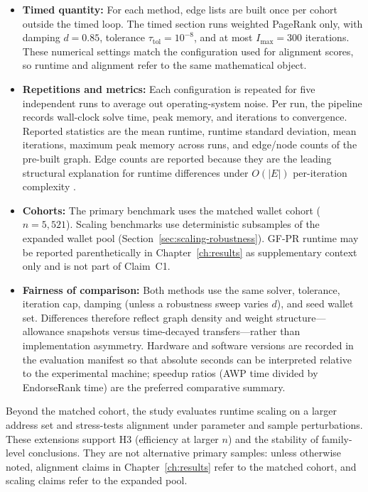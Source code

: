 \begin{itemize}
\item \textbf{Timed quantity:} For each method, edge lists are built once per cohort outside the timed loop. The timed section runs weighted PageRank only, with damping $d=0.85$, tolerance $\tau_{\mathrm{tol}}=10^{-8}$, and at most $I_{\max}=300$ iterations. These numerical settings match the configuration used for alignment scores, so runtime and alignment refer to the same mathematical object.

\item \textbf{Repetitions and metrics:} Each configuration is repeated for five independent runs to average out operating-system noise. Per run, the pipeline records wall-clock solve time, peak memory, and iterations to convergence. Reported statistics are the mean runtime, runtime standard deviation, mean iterations, maximum peak memory across runs, and edge/node counts of the pre-built graph. Edge counts are reported because they are the leading structural explanation for runtime differences under $O(|E|)$ per-iteration complexity .

\item \textbf{Cohorts:} The primary benchmark uses the matched wallet cohort ($n=5{,}521$). Scaling benchmarks use deterministic subsamples of the expanded wallet pool (Section~\ref{sec:scaling-robustness}). GF-PR runtime may be reported parenthetically in Chapter~\ref{ch:results} as supplementary context only and is not part of Claim~C1.

\item \textbf{Fairness of comparison:} Both methods use the same solver, tolerance, iteration cap, damping (unless a robustness sweep varies $d$), and seed wallet set. Differences therefore reflect graph density and weight structure---allowance snapshots versus time-decayed transfers---rather than implementation asymmetry. Hardware and software versions are recorded in the evaluation manifest so that absolute seconds can be interpreted relative to the experimental machine; speedup ratios (AWP time divided by EndorseRank time) are the preferred comparative summary.

\end{itemize}


Beyond the matched cohort, the study evaluates runtime scaling on a larger address set and stress-tests alignment under parameter and sample perturbations. These extensions support H3 (efficiency at larger $n$) and the stability of family-level conclusions. They are not alternative primary samples: unless otherwise noted, alignment claims in Chapter~\ref{ch:results} refer to the matched cohort, and scaling claims refer to the expanded pool.

